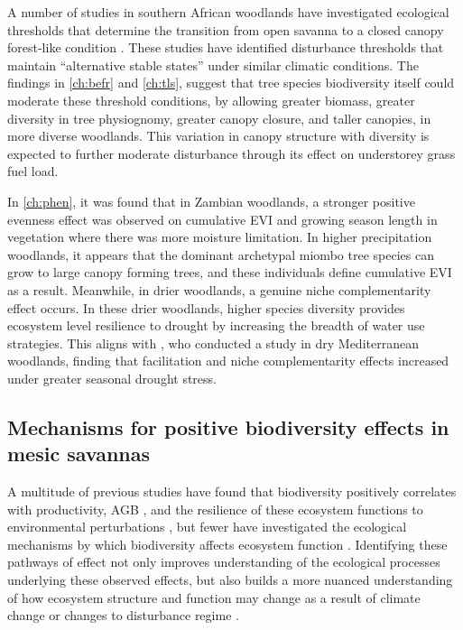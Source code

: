 \begin{refsection}
A number of studies in southern African woodlands have investigated ecological thresholds that determine the transition from open savanna to a closed canopy forest-like condition \citep{Staver2011, Hirota2011, Staver2017}. These studies have identified disturbance thresholds that maintain ``alternative stable states'' under similar climatic conditions. The findings in \autoref{ch:befr} and \autoref{ch:tls}, suggest that tree species biodiversity itself could moderate these threshold conditions, by allowing greater biomass, greater diversity in tree physiognomy, greater canopy closure, and taller canopies, in more diverse woodlands. This variation in canopy structure with diversity is expected to further moderate disturbance through its effect on understorey grass fuel load.

In \autoref{ch:phen}, it was found that in Zambian woodlands, a stronger positive evenness effect was observed on cumulative EVI and growing season length in vegetation where there was more moisture limitation. In higher precipitation woodlands, it appears that the dominant archetypal miombo tree species can grow to large canopy forming trees, and these individuals define cumulative EVI as a result. Meanwhile, in drier woodlands, a genuine niche complementarity effect occurs. In these drier woodlands, higher species diversity provides ecosystem level resilience to drought by increasing the breadth of water use strategies. This aligns with \citet{Ratcliffe2017}, who conducted a study in dry Mediterranean woodlands, finding that facilitation and niche complementarity effects increased under greater seasonal drought stress.

\subsection{Mechanisms for positive biodiversity effects in mesic savannas}
\label{discussion:ssec:mechanism}

A multitude of previous studies have found that biodiversity positively correlates with productivity, AGB \citep{Liang2016}, and the resilience of these ecosystem functions to environmental perturbations \citep{Mori2012}, but fewer have investigated the ecological mechanisms by which biodiversity affects ecosystem function \citep{Barry2019}. Identifying these pathways of effect not only improves understanding of the ecological processes underlying these observed effects, but also builds a more nuanced understanding of how ecosystem structure and function may change as a result of climate change or changes to disturbance regime \citep{Huston2014}.


\end{refsection}
